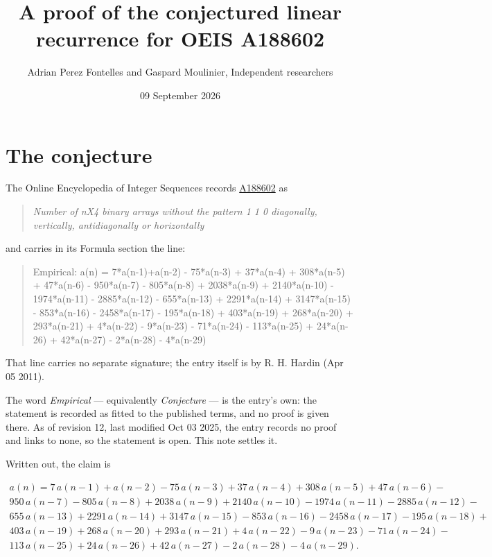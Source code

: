 \documentclass[11pt]{article}
\title{A proof of the conjectured linear recurrence for OEIS A188602}
\author{Adrian Perez Fontelles and Gaspard Moulinier, Independent researchers}
\date{09 September 2026}
\theoremstyle{definition}
\begin{document}
\maketitle
\section{The conjecture}

The Online Encyclopedia of Integer Sequences records \href{https://oeis.org/A188602}{A188602} as

\begin{quote}\itshape Number of nX4 binary arrays without the pattern 1 1 0 diagonally, vertically, antidiagonally or horizontally\end{quote}

and carries in its Formula section the line:

\begin{quote}\ttfamily Empirical: a(n) = 7*a(n-1)+a(n-2) - 75*a(n-3) + 37*a(n-4) + 308*a(n-5) + 47*a(n-6) - 950*a(n-7) - 805*a(n-8) + 2038*a(n-9) + 2140*a(n-10) - 1974*a(n-11) - 2885*a(n-12) - 655*a(n-13) + 2291*a(n-14) + 3147*a(n-15) - 853*a(n-16) - 2458*a(n-17) - 195*a(n-18) + 403*a(n-19) + 268*a(n-20) + 293*a(n-21) + 4*a(n-22) - 9*a(n-23) - 71*a(n-24) - 113*a(n-25) + 24*a(n-26) + 42*a(n-27) - 2*a(n-28) - 4*a(n-29)\end{quote}

That line carries no separate signature; the entry itself is by R. H. Hardin (Apr 05 2011).

The word {\itshape Empirical} --- equivalently {\itshape Conjecture} --- is the entry's own: the statement is recorded as fitted to the published terms, and no proof is given there. As of revision 12, last modified Oct 03 2025, the entry records no proof and links to none, so the statement is open. This note settles it.

Written out, the claim is

\begin{multline*} a(n) = 7\,a(n-1) + a(n-2) - 75\,a(n-3) + 37\,a(n-4) + 308\,a(n-5) + 47\,a(n-6) - \\ 950\,a(n-7) - 805\,a(n-8) + 2038\,a(n-9) + 2140\,a(n-10) - 1974\,a(n-11) - 2885\,a(n-12) - \\ 655\,a(n-13) + 2291\,a(n-14) + 3147\,a(n-15) - 853\,a(n-16) - 2458\,a(n-17) - 195\,a(n-18) + \\ 403\,a(n-19) + 268\,a(n-20) + 293\,a(n-21) + 4\,a(n-22) - 9\,a(n-23) - 71\,a(n-24) - \\ 113\,a(n-25) + 24\,a(n-26) + 42\,a(n-27) - 2\,a(n-28) - 4\,a(n-29). \end{multline*}
\end{document}
